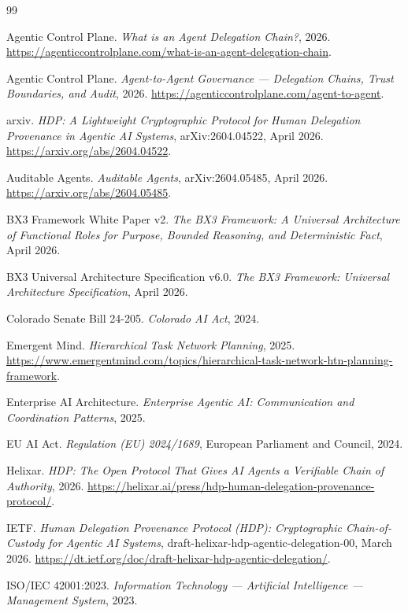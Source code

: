 \begin{thebibliography}{99}
%

%
\item Agentic Control Plane. \emph{What is an Agent Delegation Chain?}, 2026. \url{https://agenticcontrolplane.com/what-is-an-agent-delegation-chain}.
%
\item Agentic Control Plane. \emph{Agent-to-Agent Governance — Delegation Chains, Trust Boundaries, and Audit}, 2026. \url{https://agenticcontrolplane.com/agent-to-agent}.
%
\item arxiv. \emph{HDP: A Lightweight Cryptographic Protocol for Human Delegation Provenance in Agentic AI Systems}, arXiv:2604.04522, April 2026. \url{https://arxiv.org/abs/2604.04522}.
%
\item Auditable Agents. \emph{Auditable Agents}, arXiv:2604.05485, April 2026. \url{https://arxiv.org/abs/2604.05485}.
%
\item BX3 Framework White Paper v2. \emph{The BX3 Framework: A Universal Architecture of Functional Roles for Purpose, Bounded Reasoning, and Deterministic Fact}, April 2026.
%
\item BX3 Universal Architecture Specification v6.0. \emph{The BX3 Framework: Universal Architecture Specification}, April 2026.
%
\item Colorado Senate Bill 24-205. \emph{Colorado AI Act}, 2024.
%
\item Emergent Mind. \emph{Hierarchical Task Network Planning}, 2025. \url{https://www.emergentmind.com/topics/hierarchical-task-network-htn-planning-framework}.
%
\item Enterprise AI Architecture. \emph{Enterprise Agentic AI: Communication and Coordination Patterns}, 2025.
%
\item EU AI Act. \emph{Regulation (EU) 2024/1689}, European Parliament and Council, 2024.
%
\item Helixar. \emph{HDP: The Open Protocol That Gives AI Agents a Verifiable Chain of Authority}, 2026. \url{https://helixar.ai/press/hdp-human-delegation-provenance-protocol/}.
%
\item IETF. \emph{Human Delegation Provenance Protocol (HDP): Cryptographic Chain-of-Custody for Agentic AI Systems}, draft-helixar-hdp-agentic-delegation-00, March 2026. \url{https://dt.ietf.org/doc/draft-helixar-hdp-agentic-delegation/}.
%
\item ISO/IEC 42001:2023. \emph{Information Technology — Artificial Intelligence — Management System}, 2023.

\end{thebibliography}
